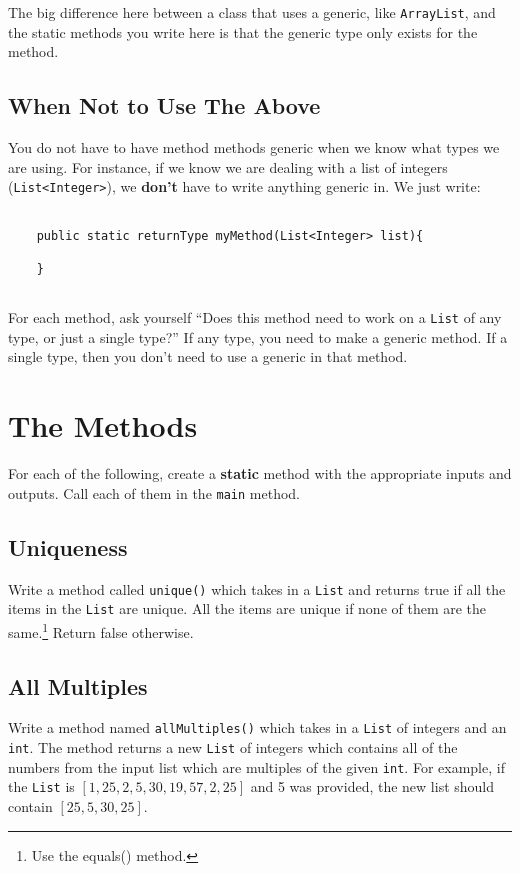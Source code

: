 \documentclass[10pt,letterpaper]{article}
\begin{document}
	The big difference here between a class that uses a generic, like \texttt{ArrayList}, and the static methods you write here is that the generic type only exists for the method. 
	
	
	\subsection{When Not to Use The Above}
	You do not have to have method methods generic when we know what types we are using.
	For instance, if we know we are dealing with a list of integers (\texttt{List<Integer>}), we \textbf{don't} have to write anything generic in.
	We just write:
	\begin{lstlisting}
	
	public static returnType myMethod(List<Integer> list){
	
	}
	
	\end{lstlisting}
	
	For each method, ask yourself ``Does this method need to work on a \texttt{List} of any type, or just a single type?''
	If any type, you need to make a generic method.
	If a single type, then you don't need to use a generic in that method.
	
	
	\newpage
	\section{The Methods}
	For each of the following, create a \textbf{static} method with the appropriate inputs and outputs.
	Call each of them in the \texttt{main} method.
	\
	
	\subsection{Uniqueness}
	Write a method called \texttt{unique()} which takes in a \texttt{List} and returns true if all the items in the \texttt{List} are unique.
	All the items are unique if none of them are the same.\footnote{Use the equals() method.} 
	Return false otherwise.

	
	\subsection{All Multiples}
	Write a method named \texttt{allMultiples()} which takes in a \texttt{List} of integers and an \texttt{int}.
	The method returns a new \texttt{List} of integers which contains all of the numbers from the input list which are multiples of the given \texttt{int}.
	For example, if the \texttt{List} is $ [1, 25, 2 ,5, 30,19, 57, 2, 25] $ and 5 was provided, the new list should contain $ [25,5,30,25] $.
\end{document}
